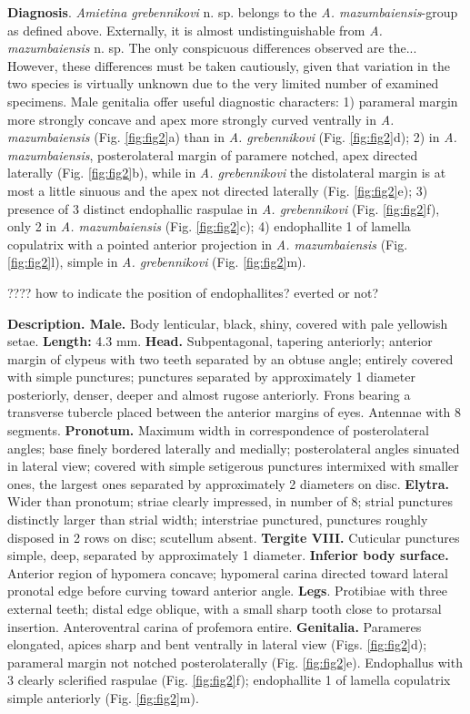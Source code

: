\documentclass[fleqn,10pt,lineno]{wlpeerj}
\begin{document}
\textbf{Diagnosis}. \textit{Amietina grebennikovi} n. sp. belongs to the \textit{A. mazumbaiensis}-group as defined above. Externally, it is almost undistinguishable from \textit{A. mazumbaiensis} n. sp. The only conspicuous differences observed are the... 
However, these differences must be taken cautiously, given that variation in the two species is virtually unknown due to the very limited number of examined specimens. Male genitalia offer useful diagnostic characters: 1) parameral margin more strongly concave and apex more strongly curved ventrally in \textit{A. mazumbaiensis} (Fig. \ref{fig:fig2}a) than in \textit{A. grebennikovi} (Fig. \ref{fig:fig2}d); 2) in \textit{A. mazumbaiensis}, posterolateral margin of paramere notched, apex directed laterally (Fig. \ref{fig:fig2}b), while in \textit{A. grebennikovi} the distolateral margin is at most a little sinuous and the apex not directed laterally (Fig. \ref{fig:fig2}e); 3) presence of 3 distinct endophallic raspulae in \textit{A. grebennikovi} (Fig. \ref{fig:fig2}f), only 2 in \textit{A. mazumbaiensis} (Fig. \ref{fig:fig2}c); 4) endophallite 1 of lamella copulatrix with a pointed anterior projection in \textit{A. mazumbaiensis} (Fig. \ref{fig:fig2}l), simple in \textit{A. grebennikovi} (Fig. \ref{fig:fig2}m).

???? how to indicate the position of endophallites? everted or not?

\textbf{Description. Male.} Body lenticular, black, shiny, covered with pale yellowish setae. \textbf{Length:} 4.3 mm. \textbf{Head.} Subpentagonal, tapering anteriorly; anterior margin of clypeus with two teeth separated by an obtuse angle; entirely covered with simple punctures; punctures separated by approximately 1 diameter posteriorly, denser, deeper and almost rugose anteriorly. Frons bearing a transverse tubercle placed between the anterior margins of eyes. Antennae with 8 segments. \textbf{Pronotum.} Maximum width in correspondence of posterolateral angles; base finely bordered laterally and medially; posterolateral angles sinuated in lateral view; covered with simple setigerous punctures intermixed with smaller ones, the largest ones separated by approximately 2 diameters on disc. \textbf{Elytra.} Wider than pronotum; striae clearly impressed, in number of 8; strial punctures distinctly larger than strial width; interstriae punctured, punctures roughly disposed in 2 rows on disc; scutellum absent. \textbf{Tergite VIII.} Cuticular punctures simple, deep, separated by approximately 1 diameter.  \textbf{Inferior body surface.} Anterior region of hypomera concave; hypomeral carina directed toward lateral pronotal edge before curving toward anterior angle. \textbf{Legs}. Protibiae with three external teeth; distal edge oblique, with a small sharp tooth close to protarsal insertion. Anteroventral carina of profemora entire. \textbf{Genitalia.} Parameres elongated, apices sharp and bent ventrally in lateral view (Figs. \ref{fig:fig2}d); parameral margin not notched posterolaterally (Fig. \ref{fig:fig2}e). Endophallus with 3 clearly sclerified raspulae (Fig. \ref{fig:fig2}f); endophallite 1 of lamella copulatrix simple anteriorly (Fig. \ref{fig:fig2}m).
\end{document}
